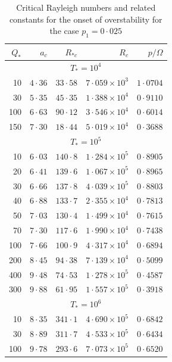 \begin{table}[htbp]
\centering
\caption{Critical Rayleigh numbers and related constants for the onset of overstability
for the case $p_1 = 0{\cdot}025$}
\label{tab:XIX}
\medskip
{\small
\begin{tabular}{@{}r r r r r@{}}
\hline
$Q_*$ & $a_c$ & $R_{*c}$ & $R_c$ & $p/\Omega$ \\
\hline
\multicolumn{5}{c}{$T_* = 10^4$} \\[3pt]
10 & $4{\cdot}36$ & $33{\cdot}58$ & $7{\cdot}059\times10^3$ & $1{\cdot}0704$ \\
30 & $5{\cdot}35$ & $45{\cdot}35$ & $1{\cdot}388\times10^4$ & $0{\cdot}9110$ \\
100 & $6{\cdot}63$ & $90{\cdot}12$ & $3{\cdot}546\times10^4$ & $0{\cdot}6014$ \\
150 & $7{\cdot}30$ & $18{\cdot}44$ & $5{\cdot}019\times10^4$ & $0{\cdot}3688$ \\[6pt]
\multicolumn{5}{c}{$T_* = 10^5$} \\[3pt]
10 & $6{\cdot}03$ & $140{\cdot}8$ & $1{\cdot}284\times10^5$ & $0{\cdot}8905$ \\
20 & $6{\cdot}41$ & $139{\cdot}6$ & $1{\cdot}067\times10^5$ & $0{\cdot}8965$ \\
30 & $6{\cdot}66$ & $137{\cdot}8$ & $4{\cdot}039\times10^5$ & $0{\cdot}8803$ \\
40 & $6{\cdot}88$ & $133{\cdot}7$ & $2{\cdot}355\times10^4$ & $0{\cdot}7813$ \\
50 & $7{\cdot}03$ & $130{\cdot}4$ & $1{\cdot}499\times10^4$ & $0{\cdot}7615$ \\
70 & $7{\cdot}30$ & $117{\cdot}6$ & $1{\cdot}990\times10^4$ & $0{\cdot}7438$ \\
100 & $7{\cdot}66$ & $100{\cdot}9$ & $4{\cdot}317\times10^4$ & $0{\cdot}6894$ \\
200 & $8{\cdot}45$ & $94{\cdot}38$ & $7{\cdot}139\times10^4$ & $0{\cdot}5099$ \\
400 & $9{\cdot}48$ & $74{\cdot}53$ & $1{\cdot}278\times10^5$ & $0{\cdot}4587$ \\
300 & $9{\cdot}88$ & $61{\cdot}95$ & $1{\cdot}557\times10^5$ & $0{\cdot}3918$ \\[6pt]
\multicolumn{5}{c}{$T_* = 10^6$} \\[3pt]
10 & $8{\cdot}35$ & $341{\cdot}1$ & $4{\cdot}690\times10^5$ & $0{\cdot}6842$ \\
30 & $8{\cdot}89$ & $311{\cdot}7$ & $4{\cdot}533\times10^5$ & $0{\cdot}6434$ \\
100 & $9{\cdot}78$ & $293{\cdot}6$ & $7{\cdot}073\times10^5$ & $0{\cdot}6520$ \\

\end{tabular}}
\end{table}

